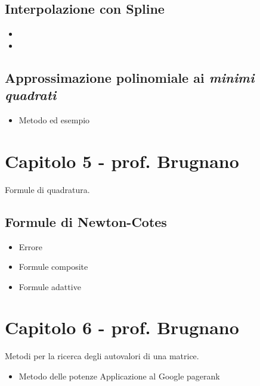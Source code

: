\documentclass[a4paper, 12pt]{article}
\begin{document}
\subsection{Interpolazione con Spline}
	\begin{itemize}
		\item \color{green}{Spline cubica naturale} \color{black}
		\item \color{green}{Spline cubica not-a-knot} \color{black}
	\end{itemize}

\subsection{Approssimazione polinomiale ai \textit{minimi quadrati}}
	\begin{itemize}
		\item Metodo ed esempio
	\end{itemize}

\vspace{0.5cm}

\section{Capitolo 5 - prof. Brugnano}

Formule di quadratura.

\subsection{Formule di Newton-Cotes}

	\begin{itemize}
		\item Errore
		\item Formule composite
		\subitem \color{green}{Formula dei Trapezi} \color{black}
		\subitem \color{green}{Formula di Simpson} \color{black}
		\item Formule adattive
	\end{itemize}

\vspace{0.5cm}

\section{Capitolo 6 - prof. Brugnano}

Metodi per la ricerca degli autovalori di una matrice.

	\begin{itemize}
		\item Metodo delle potenze
		\subitem Applicazione al Google pagerank
	\end{itemize}
\end{document}
